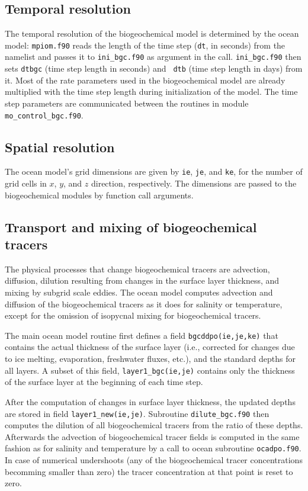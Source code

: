 \documentclass[11pt,a4paper,fleqn,twoside]{article}
\begin{document}
\subsection{\label{temporal_resolution}Temporal resolution}

The temporal resolution of the biogeochemical model is determined by the ocean
model: {\tt mpiom.f90} reads the length of the time step ({\tt dt}, in seconds) from
the namelist and passes it to {\tt ini\_bgc.f90} as argument in the call. 
{\tt ini\_bgc.f90} then sets {\tt dtbgc} (time step length in seconds) and {\tt
dtb} (time step length in days) from it. Most of the rate parameters used in
the biogeochemical model are already multiplied with the time step length during
initialization of the model. The time step parameters are communicated between
the routines in module {\tt mo\_control\_bgc.f90}. 

\subsection{\label{spatial_resolution}Spatial resolution}

The ocean model's grid dimensions are given by {\tt ie}, {\tt je}, and
{\tt ke}, for the number of grid cells in $x$, $y$, and $z$ direction, respectively. 
The dimensions are passed to the biogeochemical modules by function call arguments.

\subsection{\label{transport}Transport and mixing of biogeochemical
tracers}

The physical processes that change biogeochemical tracers are 
advection, diffusion, dilution resulting from changes in the surface layer thickness,
and mixing by subgrid scale eddies. The ocean model computes advection and diffusion of the biogeochemical
tracers as it does for salinity or temperature, except for the omission of isopycnal
mixing for biogeochemical tracers.

The main ocean model routine first defines a field {\tt bgcddpo(ie,je,ke)}  that contains
the actual thickness of the surface layer (i.e., corrected for changes due to ice
melting, evaporation, freshwater fluxes, etc.), and the standard depths for all
layers. A subset of this field, {\tt layer1\_bgc(ie,je)} contains only
the thickness of the surface layer at the beginning of each time step. 

After the computation of changes in surface layer thickness,
the updated depths are stored in field {\tt layer1\_new(ie,je)}. 
Subroutine {\tt dilute\_bgc.f90} then computes the dilution of all 
biogeochemical tracers from the ratio of these depths. 
Afterwards the advection of biogeochemical tracer fields 
is computed in the same fashion as for salinity and temperature
by a call to ocean subroutine {\tt ocadpo.f90}. In case of 
numerical undershoots (any of the biogeochemical tracer concentrations becomming smaller 
than zero) the tracer concentration at that point is reset to zero. 
\end{document}
